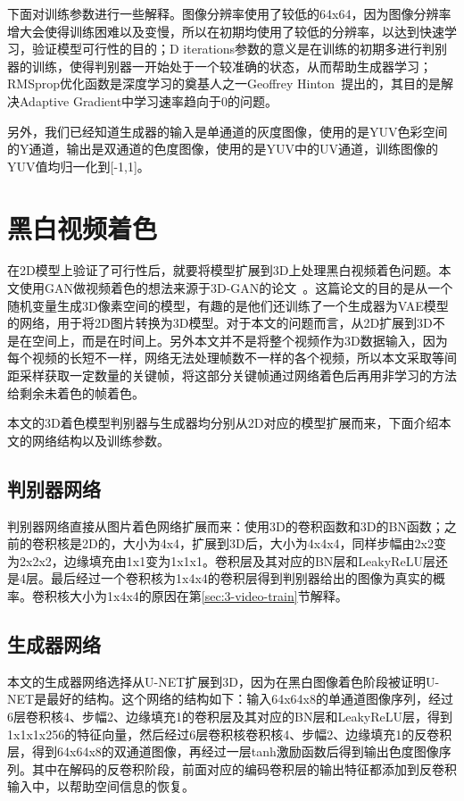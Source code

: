   下面对训练参数进行一些解释。图像分辨率使用了较低的64x64，因为图像分辨率增大会使得训练困难以及变慢，所以在初期均使用了较低的分辨率，以达到快速学习，验证模型可行性的目的；D iterations参数的意义是在训练的初期多进行判别器的训练，使得判别器一开始处于一个较准确的状态，从而帮助生成器学习；RMSprop优化函数是深度学习的奠基人之一Geoffrey Hinton~\cite{Tieleman2012}提出的，其目的是解决Adaptive Gradient中学习速率趋向于0的问题。

  另外，我们已经知道生成器的输入是单通道的灰度图像，使用的是YUV色彩空间的Y通道，输出是双通道的色度图像，使用的是YUV中的UV通道，训练图像的YUV值均归一化到[-1,1]。

\section{黑白视频着色}
\label{sec:3-video-color}

  在2D模型上验证了可行性后，就要将模型扩展到3D上处理黑白视频着色问题。本文使用GAN做视频着色的想法来源于3D-GAN的论文~\cite{DBLP:conf/nips/0001ZXFT16}。这篇论文的目的是从一个随机变量生成3D像素空间的模型，有趣的是他们还训练了一个生成器为VAE模型的网络，用于将2D图片转换为3D模型。对于本文的问题而言，从2D扩展到3D不是在空间上，而是在时间上。另外本文并不是将整个视频作为3D数据输入，因为每个视频的长短不一样，网络无法处理帧数不一样的各个视频，所以本文采取等间距采样获取一定数量的关键帧，将这部分关键帧通过网络着色后再用非学习的方法给剩余未着色的帧着色。

  本文的3D着色模型判别器与生成器均分别从2D对应的模型扩展而来，下面介绍本文的网络结构以及训练参数。

\subsection{判别器网络}
\label{sec:3-video-dnet}
  
  判别器网络直接从图片着色网络扩展而来：使用3D的卷积函数和3D的BN函数；之前的卷积核是2D的，大小为4x4，扩展到3D后，大小为4x4x4，同样步幅由2x2变为2x2x2，边缘填充由1x1变为1x1x1。卷积层及其对应的BN层和LeakyReLU层还是4层。最后经过一个卷积核为1x4x4的卷积层得到判别器给出的图像为真实的概率。卷积核大小为1x4x4的原因在第\ref{sec:3-video-train}节解释。
  
\subsection{生成器网络}
\label{sec:3-video-gnet}

  本文的生成器网络选择从U-NET扩展到3D，因为在黑白图像着色阶段被证明U-NET是最好的结构。这个网络的结构如下：输入64x64x8的单通道图像序列，经过6层卷积核4、步幅2、边缘填充1的卷积层及其对应的BN层和LeakyReLU层，得到1x1x1x256的特征向量，然后经过6层卷积核卷积核4、步幅2、边缘填充1的反卷积层，得到64x64x8的双通道图像，再经过一层tanh激励函数后得到输出色度图像序列。其中在解码的反卷积阶段，前面对应的编码卷积层的输出特征都添加到反卷积输入中，以帮助空间信息的恢复。

